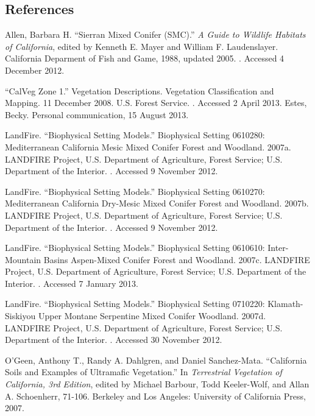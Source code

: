 \subsection*{References}
\begin{hangparas}{.25in}{1} 
Allen, Barbara H. ``Sierran Mixed Conifer (SMC).'' \emph{A Guide to Wildlife Habitats of California}, edited by Kenneth E. Mayer and William F. Laudenslayer. California Deparment of Fish and Game, 1988, updated 2005. . Accessed 4 December 2012.

``CalVeg Zone 1.'' Vegetation Descriptions. Vegetation Classification and Mapping.  11 December 2008. U.S. Forest Service. . Accessed 2 April 2013.
Estes, Becky. Personal communication, 15 August 2013.

LandFire. ``Biophysical Setting Models.'' Biophysical Setting 0610280: Mediterranean California Mesic Mixed Conifer Forest and Woodland. 2007a. LANDFIRE Project, U.S. Department of Agriculture, Forest Service; U.S. Department of the Interior. . Accessed 9 November 2012.

LandFire. ``Biophysical Setting Models.'' Biophysical Setting 0610270: Mediterranean California Dry-Mesic Mixed Conifer Forest and Woodland. 2007b. LANDFIRE Project, U.S. Department of Agriculture, Forest Service; U.S. Department of the Interior. . Accessed 9 November 2012.

LandFire. ``Biophysical Setting Models.'' Biophysical Setting 0610610: Inter-Mountain Basins Aspen-Mixed Conifer Forest and Woodland. 2007c. LANDFIRE Project, U.S. Department of Agriculture, Forest Service; U.S. Department of the Interior. . Accessed 7 January 2013.

LandFire. ``Biophysical Setting Models.'' Biophysical Setting 0710220: Klamath-Siskiyou Upper Montane Serpentine Mixed Conifer Woodland. 2007d. LANDFIRE Project, U.S. Department of Agriculture, Forest Service; U.S. Department of the Interior. . Accessed 30 November 2012.

O’Geen, Anthony T., Randy A. Dahlgren, and Daniel Sanchez-Mata. ``California Soils and Examples of Ultramafic Vegetation.'' In \emph{Terrestrial Vegetation of California, 3rd Edition}, edited by Michael Barbour, Todd Keeler-Wolf, and Allan A. Schoenherr, 71-106. Berkeley and Los Angeles: University of California Press, 2007. 


\end{hangparas}
